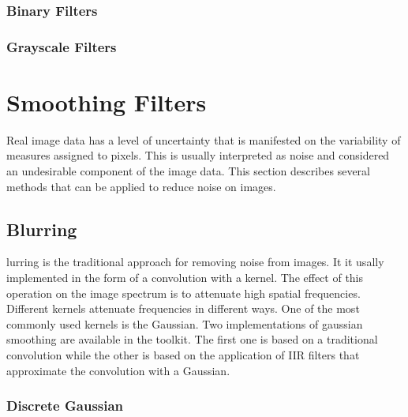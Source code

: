 \subsubsection{Binary Filters}
\label{sec:MathematicalMorphologyBinaryFilters}

%


\subsubsection{Grayscale Filters}
\label{sec:MathematicalMorphologyGrayscaleFilters}

%




\section{Smoothing Filters}
\label{sec:SmoothingFilters}

Real image data has a level of uncertainty that is manifested on the
variability of measures assigned to pixels. This is usually interpreted as
noise and considered an undesirable component of the image data. This section
describes several methods that can be applied to reduce noise on images.

\subsection{Blurring}
\label{sec:BlurringFilters}

lurring is the traditional approach for removing noise from images. It it
usally implemented in the form of a convolution with a kernel. The effect of
this operation on the image spectrum is to attenuate high spatial frequencies.
Different kernels attenuate frequencies in different ways. One of the most
commonly used kernels is the Gaussian. Two implementations of gaussian
smoothing are available in the toolkit. The first one is based on a traditional
convolution while the other is based on the application of IIR filters that
approximate the convolution with a Gaussian. 

\subsubsection{Discrete Gaussian}
\label{sec:DiscreteGaussianImageFilter}

%


